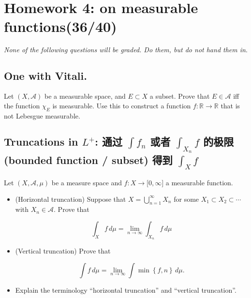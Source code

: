 \chapter{Homework 4: on measurable functions(36/40)}\label{homework-4-on-measurable-functions3640}

\emph{None of the following questions will be graded. Do them, but do not hand them in}.

\section{One with Vitali.}

Let \((X,\mathcal{A})\) be a measurable space, and \(E \subset X\) a subset. Prove that \(E \in \mathcal{A}\) iff the function \(\chi_{E}\) is measurable. Use this to construct a function \(f:\mathbb{R}\rightarrow\mathbb{R}\) that is not Lebesgue measurable.

\section{\texorpdfstring{Truncations in \(L^{+}\): 通过 \(\int f_{n}\) 或者 \(\int_{X_{n}}f\) 的极限 (bounded function / subset) 得到 \(\int_{X}f\)}{Truncations in L\^{}\{+\}: 通过 \textbackslash int f\_\{n\} 或者 \textbackslash int\_\{X\_\{n\}\}f 的极限 (bounded function / subset) 得到 \textbackslash int\_\{X\}f}}\label{truncations-in-l-ux901aux8fc7-int-f_n-ux6216ux8005-int_x_n-f-ux7684ux6781ux9650-bounded-function-subset-ux5f97ux5230-int_x-f}

Let \((X,\mathcal{A},\mu)\) be a measure space and \(f:X\rightarrow\lbrack 0,\infty\rbrack\) a measurable function.

\begin{itemize}
\item
  (Horizontal truncation) Suppose that \(X = \bigcup_{n = 1}^{\infty}X_{n}\) for some \(X_{1} \subset X_{2} \subset \cdots\) with \(X_{n} \in \mathcal{A}\). Prove that

  \[\int_{X}f\, d\mu = \lim\limits_{n\rightarrow\infty}\int_{X_{n}}f\, d\mu\]
\item
  (Vertical truncation) Prove that

  \[\int f\, d\mu = \lim\limits_{n\rightarrow\infty}\int\min\left\{ {f,n} \right\}\, d\mu.\]
\item
  Explain the terminology ``horizontal truncation'' and ``vertical truncation''.
\end{itemize}

